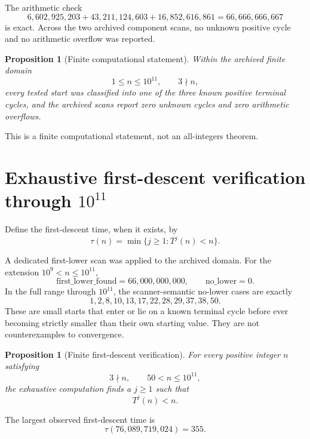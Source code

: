 \documentclass[11pt]{article}
\newtheorem{proposition}[theorem]{Proposition}
\theoremstyle{definition}
\theoremstyle{remark}
\begin{document}
The arithmetic check
\[
6,602,925,203+
43,211,124,603+
16,852,616,861
=
66,666,666,667
\]
is exact.  Across the two archived component scans, no unknown positive cycle and no arithmetic overflow was reported.

\begin{proposition}[Finite computational statement]
Within the archived finite domain
\[
1\le n\le10^{11},\qquad3\nmid n,
\]
every tested start was classified into one of the three known positive terminal cycles, and the archived scans report zero unknown cycles and zero arithmetic overflows.
\end{proposition}

This is a finite computational statement, not an all-integers theorem.

\section{Exhaustive first-descent verification through \texorpdfstring{$10^{11}$}{10 to the 11}}

Define the first-descent time, when it exists, by
\begin{equation}
\tau(n)=\min\{j\ge1:T^j(n)<n\}.
\label{eq:tau}
\end{equation}

A dedicated first-lower scan was applied to the archived domain.  For the extension $10^9<n\le10^{11}$,
\[
\text{first\_lower\_found}=66,000,000,000,
\qquad
\text{no\_lower}=0.
\]
In the full range through $10^{11}$, the scanner-semantic no-lower cases are exactly
\begin{equation}
1,2,8,10,13,17,22,28,29,37,38,50.
\label{eq:12exceptions}
\end{equation}
These are small starts that enter or lie on a known terminal cycle before ever becoming strictly smaller than their own starting value.  They are not counterexamples to convergence.

\begin{proposition}[Finite first-descent verification]
For every positive integer $n$ satisfying
\begin{equation}
3\nmid n,\qquad50<n\le10^{11},
\end{equation}
the exhaustive computation finds a $j\ge1$ such that
\begin{equation}
\boxed{T^j(n)<n.}
\label{eq:finite-first-descent}
\end{equation}
\end{proposition}

The largest observed first-descent time is
\begin{equation}
\boxed{
\tau(76,089,719,024)=355.
}
\label{eq:record-tau}
\end{equation}
\end{document}

